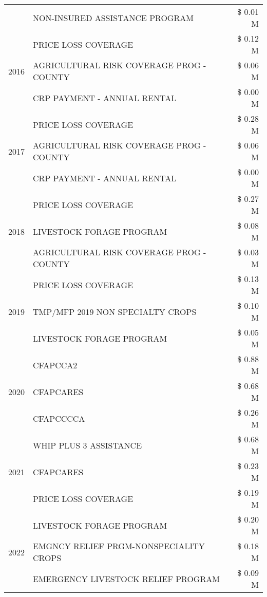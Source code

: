 \begin{tabular}{llr}
 & NON-INSURED ASSISTANCE PROGRAM & \$ 0.01 M \\
\cline{1-3}
\multirow[t]{3}{*}{2016} & PRICE LOSS COVERAGE & \$ 0.12 M \\
 & AGRICULTURAL RISK COVERAGE PROG - COUNTY & \$ 0.06 M \\
 & CRP PAYMENT - ANNUAL RENTAL & \$ 0.00 M \\
\cline{1-3}
\multirow[t]{3}{*}{2017} & PRICE LOSS COVERAGE & \$ 0.28 M \\
 & AGRICULTURAL RISK COVERAGE PROG - COUNTY & \$ 0.06 M \\
 & CRP PAYMENT - ANNUAL RENTAL & \$ 0.00 M \\
\cline{1-3}
\multirow[t]{3}{*}{2018} & PRICE LOSS COVERAGE & \$ 0.27 M \\
 & LIVESTOCK FORAGE PROGRAM & \$ 0.08 M \\
 & AGRICULTURAL RISK COVERAGE PROG - COUNTY & \$ 0.03 M \\
\cline{1-3}
\multirow[t]{3}{*}{2019} & PRICE LOSS COVERAGE & \$ 0.13 M \\
 & TMP/MFP 2019 NON SPECIALTY CROPS & \$ 0.10 M \\
 & LIVESTOCK FORAGE PROGRAM & \$ 0.05 M \\
\cline{1-3}
\multirow[t]{3}{*}{2020} & CFAPCCA2 & \$ 0.88 M \\
 & CFAPCARES & \$ 0.68 M \\
 & CFAPCCCCA & \$ 0.26 M \\
\cline{1-3}
\multirow[t]{3}{*}{2021} & WHIP PLUS 3 ASSISTANCE & \$ 0.68 M \\
 & CFAPCARES & \$ 0.23 M \\
 & PRICE LOSS COVERAGE & \$ 0.19 M \\
\cline{1-3}
\multirow[t]{3}{*}{2022} & LIVESTOCK FORAGE PROGRAM & \$ 0.20 M \\
 & EMGNCY RELIEF PRGM-NONSPECIALITY CROPS & \$ 0.18 M \\
 & EMERGENCY LIVESTOCK RELIEF PROGRAM & \$ 0.09 M \\
\cline{1-3}
\bottomrule
\end{tabular}
